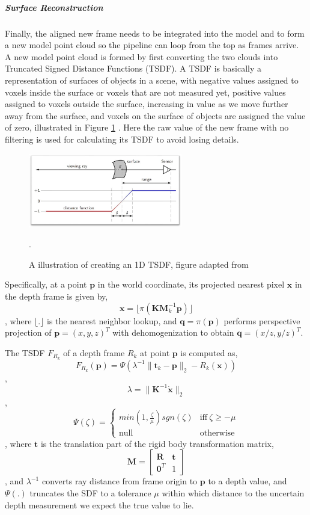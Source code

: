 \documentclass{ut-thesis}
\begin{document}
\subparagraph{Surface Reconstruction}
Finally, the aligned new frame needs to be integrated into the model and to form a new model point cloud so the pipeline can loop from the top as frames arrive.  A new model point cloud is formed by first converting the two clouds into Truncated Signed Distance Functions (TSDF).  A TSDF is basically a representation of surfaces of objects in a scene, with negative values assigned to voxels inside the surface or voxels that are not measured yet, positive values assigned to voxels outside the surface, increasing in value as we move further away from the surface, and voxels on the surface of objects are assigned the value of zero, illustrated in Figure \ref{fig:TSDF} \cite{newcombe2011kinectfusion}.  Here the raw value of the new frame with no filtering is used for calculating its TSDF to avoid losing details.
\begin{figure} [h]
	\centering
	\includegraphics[width=0.6\textwidth]{./img/TSDF.jpg}
	\caption{A illustration of creating an 1D TSDF, figure adapted from \cite{pirovano2011kinfu}}.
	\label{fig:TSDF}
\end{figure}

Specifically, at a point \(\textbf{p}\) in the world coordinate, its projected nearest pixel \(\textbf{x}\) in the depth frame is given by,
\[  \textbf{x} = \lfloor \pi (\textbf{K} \textbf{M}^{-1}_{k} \textbf{p}) \rfloor  \]
, where \( \lfloor.\rfloor \) is the nearest neighbor lookup, and \( \textbf{q} = \pi(\textbf{p}) \) performs perspective projection of \(\textbf{p} = (x,y,z)^T\) with dehomogenization to obtain \(\textbf{q} = (x/z, y/z)^T\).

The TSDF \(F_{R_k}\) of a depth frame \(R_k\) at point \(\textbf{p}\) is computed as,
\[  F_{R_k}(\textbf{p}) = \Psi(\lambda^{-1}\|\textbf{t}_k - \textbf{p}\|_2 - R_k(\textbf{x}))  \]
, \[  \lambda = \|\textbf{K}^{-1} \dot{\textbf{x}} \|_2   \]
, 
\[
\Psi(\zeta) = 
\begin{cases}
min(1, \frac{\zeta}{\mu}) sgn(\zeta)  & \text{iff}\ \zeta \geq -\mu \\
\text{null} & \text{otherwise}
\end{cases}
\]
, where \(\textbf{t}\) is the translation part of the rigid body transformation matrix,
\[  \textbf{M} = 
\begin{bmatrix}
\textbf{R}		&	\textbf{t} \\
\textbf{0}^T	&	1
\end{bmatrix}  \]
, and \(\lambda^{-1}\) converts ray distance from frame origin to \(\textbf{p}\) to a depth value, and \(\Psi(.)\) truncates the SDF to a tolerance \(\mu\) within which distance to the uncertain depth measurement we expect the true value to lie.
\end{document}
